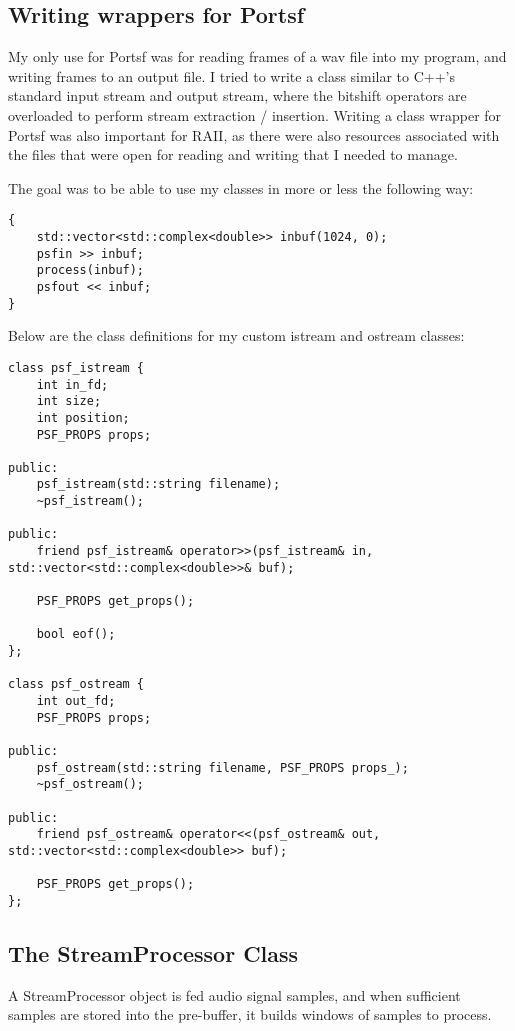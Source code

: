 \pagebreak

\subsection{Writing wrappers for Portsf}
My only use for Portsf was for reading frames of a wav file into my program,
and writing frames to an output file. 
I tried to write a class similar to C++'s standard input stream and output stream,
where the bitshift operators are overloaded to perform stream extraction / insertion.
Writing a class wrapper for Portsf was also important for RAII, as there
were also resources associated with the files that were open for reading and writing
that I needed to manage.

The goal was to be able to use my classes in more or less the following way:
\begin{verbatim}
{
    std::vector<std::complex<double>> inbuf(1024, 0);
    psfin >> inbuf;
    process(inbuf);
    psfout << inbuf;
}
\end{verbatim}

Below are the class definitions for my custom istream and ostream classes:
\begin{verbatim}
class psf_istream {
    int in_fd;
    int size;
    int position;
    PSF_PROPS props;

public:
    psf_istream(std::string filename);
    ~psf_istream();

public:
    friend psf_istream& operator>>(psf_istream& in, std::vector<std::complex<double>>& buf);

    PSF_PROPS get_props();

    bool eof();
};

class psf_ostream {
    int out_fd;
    PSF_PROPS props;

public:
    psf_ostream(std::string filename, PSF_PROPS props_);
    ~psf_ostream();

public:
    friend psf_ostream& operator<<(psf_ostream& out, std::vector<std::complex<double>> buf);

    PSF_PROPS get_props();
};
\end{verbatim}

\pagebreak 

\subsection{The StreamProcessor Class}
A StreamProcessor object is fed audio signal samples, and when sufficient samples
are stored into the pre-buffer, it builds windows of samples to process.

